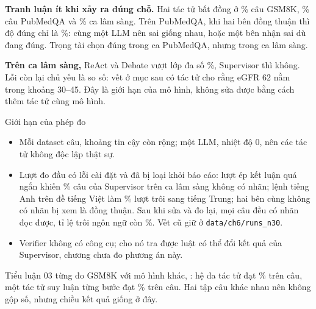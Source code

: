 \textbf{Tranh luận ít khi xảy ra đúng chỗ.} Hai tác tử bất đồng ở \% câu GSM8K, \% câu PubMedQA và \% ca lâm sàng. Trên PubMedQA, khi hai bên đồng thuận thì độ đúng chỉ là \%: cùng một LLM nên sai giống nhau, hoặc một bên nhận sai dù đang đúng. Trọng tài chọn đúng  trong  ca PubMedQA, nhưng  trong  ca lâm sàng.

\textbf{Trên ca lâm sàng,} ReAct và Debate vượt lớp đa số \%, Supervisor thì không. Lỗi còn lại chủ yếu là so số: vết ở mục sau có tác tử cho rằng eGFR 62 nằm trong khoảng 30--45. Đây là giới hạn của mô hình, không sửa được bằng cách thêm tác tử cùng mô hình.

\begin{luuy}{Giới hạn của phép đo}
\begin{itemize}
\item Mỗi dataset  câu, khoảng tin cậy còn rộng; một LLM, nhiệt độ 0, nên các tác tử không độc lập thật sự.
\item Lượt đo đầu có lỗi cài đặt và đã bị loại khỏi báo cáo: lượt ép kết luận quá ngắn khiến \% câu của Supervisor trên ca lâm sàng không có nhãn; lệnh tiếng Anh trên đề tiếng Việt làm \% lượt trôi sang tiếng Trung; hai bên cùng không có nhãn bị xem là đồng thuận. Sau khi sửa và đo lại, mọi câu đều có nhãn đọc được, tỉ lệ trôi ngôn ngữ còn \%. Vết cũ giữ ở \texttt{data/ch6/runs\_n30}.
\item Verifier không có công cụ; cho nó tra được luật có thể đổi kết quả của Supervisor, chương chưa đo phương án này.
\end{itemize}
\end{luuy}

Tiểu luận 03 từng đo GSM8K với mô hình khác, : hệ đa tác tử đạt \% trên  câu, một tác tử suy luận từng bước đạt \% trên  câu. Hai tập câu khác nhau nên không gộp số, nhưng chiều kết quả giống ở đây.

